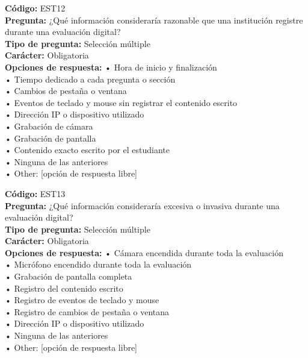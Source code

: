 \begin{infobox}\small
\textbf{\textcolor{accent}{Código:}} EST12\\
\textbf{\textcolor{accent}{Pregunta:}} ¿Qué información consideraría razonable que una institución registre durante una evaluación digital?\\
\textbf{\textcolor{accent}{Tipo de pregunta:}} Selección múltiple\\
\textbf{\textcolor{accent}{Carácter:}} Obligatoria\\
\textbf{\textcolor{accent}{Opciones de respuesta:}} • Hora de inicio y finalización \\ • Tiempo dedicado a cada pregunta o sección \\ • Cambios de pestaña o ventana \\ • Eventos de teclado y mouse sin registrar el contenido escrito \\ • Dirección IP o dispositivo utilizado \\ • Grabación de cámara \\ • Grabación de pantalla \\ • Contenido exacto escrito por el estudiante \\ • Ninguna de las anteriores \\ • Other: [opción de respuesta libre]\\
\end{infobox}
\begin{infobox}\small
\textbf{\textcolor{accent}{Código:}} EST13\\
\textbf{\textcolor{accent}{Pregunta:}} ¿Qué información consideraría excesiva o invasiva durante una evaluación digital?\\
\textbf{\textcolor{accent}{Tipo de pregunta:}} Selección múltiple\\
\textbf{\textcolor{accent}{Carácter:}} Obligatoria\\
\textbf{\textcolor{accent}{Opciones de respuesta:}} • Cámara encendida durante toda la evaluación \\ • Micrófono encendido durante toda la evaluación \\ • Grabación de pantalla completa \\ • Registro del contenido escrito \\ • Registro de eventos de teclado y mouse \\ • Registro de cambios de pestaña o ventana \\ • Dirección IP o dispositivo utilizado \\ • Ninguna de las anteriores \\ • Other: [opción de respuesta libre]\\
\end{infobox}
